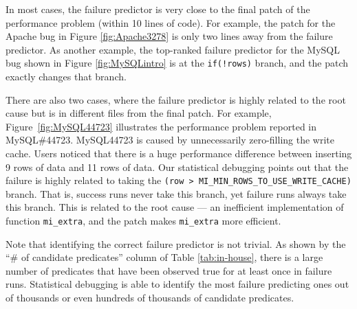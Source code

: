 In most cases, the failure predictor
is very close to the final patch of the performance problem (within 10 lines
of code).
For example, the patch for the Apache bug in Figure 
\ref{fig:Apache3278} is only two lines away from the failure predictor.
As another example, 
the top-ranked failure predictor for the MySQL bug shown in 
Figure \ref{fig:MySQLintro} is at the \lstinline{if(!rows)} branch, and
the patch exactly changes that branch. 




There are also two cases, where the failure predictor is highly related to the
root cause but is in different files from the final patch.
For example, Figure~\ref{fig:MySQL44723} illustrates the performance problem
reported in MySQL\#44723.
MySQL44723 is caused by unnecessarily zero-filling the write cache. 
Users noticed that there is a huge performance difference between 
inserting 9 rows of data and 11 rows of data.
Our statistical debugging points out that the failure is highly
related to taking the
\texttt{(row > MI\_MIN\_ROWS\_TO\_USE\_WRITE\_CACHE)} branch.
That is, success runs never take this branch, yet failure runs always
take this branch.
This is related to the root cause --- an inefficient implementation
of function \texttt{mi\_extra}, and the patch makes \texttt{mi\_extra}
more efficient.

Note that identifying the correct failure predictor is not trivial.
As shown by the ``\# of candidate predicates'' column
of Table \ref{tab:in-house}, there is a large number of predicates that
have been observed true for at least once in failure runs.
Statistical debugging is able to identify the most failure predicting ones
out of thousands or even hundreds of thousands of candidate predicates.

